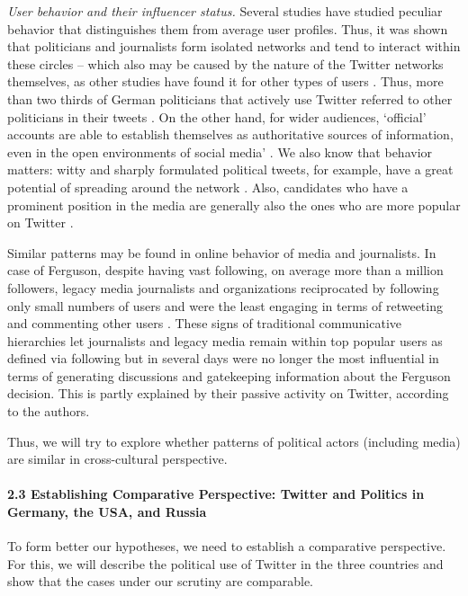 \textit{User behavior and their influencer status.} Several studies \cite{EnliSimonsen,GrahamBroersmaHazelhoff,LarssonIhlen} have studied peculiar behavior that distinguishes them from average user profiles. Thus, it was shown that politicians and journalists form isolated networks and tend to interact within these circles – which also may be caused by the nature of the Twitter networks themselves, as other studies have found it for other types of users \cite{BodrunovaLitvinenkoNigmatullina,BodrunovaLitvinenkoBlekanov2016}. Thus, more than two thirds of German politicians that actively use Twitter referred to other politicians in their tweets \cite{BaumannFabianLessmann}. On the other hand, for wider audiences, ‘official’ accounts are able to establish themselves as authoritative sources of information, even in the open environments of social media’ \cite{BrunsBurgees2012}. We also know that behavior matters: witty and sharply formulated political tweets, for example, have a great potential of spreading around the network \cite{AelstVanErkelDheer,ParmeleeBichard}. Also, candidates who have a prominent position in the media are generally also the ones who are more popular on Twitter \cite{AelstVanErkelDheer}.

Similar patterns may be found in online behavior of media and journalists. In case of Ferguson, despite having vast following, on average more than a million followers, legacy media journalists and organizations reciprocated by following only small numbers of users and were the least engaging in terms of retweeting and commenting other users \cite{GroshekTandoc}. These signs of traditional communicative hierarchies let journalists and legacy media remain within top popular users as defined via following but in several days were no longer the most influential in terms of generating discussions and gatekeeping information about the Ferguson decision. This is partly explained by their passive activity on Twitter, according to the authors.

Thus, we will try to explore whether patterns of political actors (including media) are similar in cross-cultural perspective.

\paragraph{2.3 Establishing Comparative Perspective: Twitter and Politics in Germany, the USA, and Russia}

To form better our hypotheses, we need to establish a comparative perspective. For this, we will describe the political use of Twitter in the three countries and show that the cases under our scrutiny are comparable.

